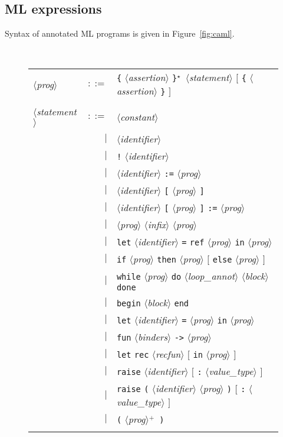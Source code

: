 \documentclass[a4paper,12pt]{report}
\makeatletter
\newcommand{\te}[1]{\texttt{#1}}
\newcommand{\nt}[1]{$\langle$\textsl{#1}$\rangle$}
\newcommand{\indexnt}[1]{\index{#1@\textsl{#1}, grammar entry}}
\newcommand{\etoile}{$^{\star}$}
\newcommand{\plus}{$^+$}
\makeatother
\begin{document}
\subsection{ML expressions}
\label{syntax:mlexpr}

Syntax of annotated ML programs is given in Figure~\ref{fig:caml}.
\begin{figure}[htbp]
\begin{center}
\hrulefill\\
\begin{tabular}{lrl}
  \nt{prog}\indexnt{prog}
    & $::=$ & \te{\{} \nt{assertion} \te{\}}\etoile\
              \nt{statement} 
              $[$ \te{\{} \nt{assertion} \te{\}} $]$ \\
  \\[0.1em]

  \nt{statement}\indexnt{statement}
    & $::=$ & \nt{constant} \\
      & $|$ & \nt{identifier} \\
      & $|$ & \te{!} \nt{identifier} \\
      & $|$ & \nt{identifier} \te{:=} \nt{prog} \\
      & $|$ & \nt{identifier} \te{[} \nt{prog} \te{]} \\
      & $|$ & \nt{identifier} \te{[} \nt{prog} \te{]} \te{:=} \nt{prog} \\
      & $|$ & \nt{prog} \nt{infix} \nt{prog} \\
      & $|$ & \te{let} \nt{identifier} \te{=} \te{ref} 
              \nt{prog} \te{in} \nt{prog} \\
      & $|$ & \te{if} \nt{prog} \te{then} \nt{prog}
              $[$ \te{else} \nt{prog} $]$ \\
      & $|$ & \te{while} \nt{prog} \te{do}
              \nt{loop\_annot} \nt{block} \te{done} \\
      & $|$ & \te{begin} \nt{block} \te{end} \\
      & $|$ & \te{let} \nt{identifier} \te{=} \nt{prog} 
              \te{in} \nt{prog} \\
      & $|$ & \te{fun} \nt{binders} \te{->} \nt{prog} \\
      & $|$ & \te{let} \te{rec} \nt{recfun} $[$ \te{in} \nt{prog} $]$ \\
      & $|$ & \te{raise} \nt{identifier} $[$ \te{:} \nt{value\_type} $]$ \\
      & $|$ & \te{raise} \te{(} \nt{identifier} \nt{prog} \te{)}
              $[$ \te{:} \nt{value\_type} $]$ \\
      & $|$ & \te{(} \nt{prog}\plus\  \te{)} \\
  \\[0.1em]


\end{tabular}
\end{center}
\end{figure}
\end{document}

